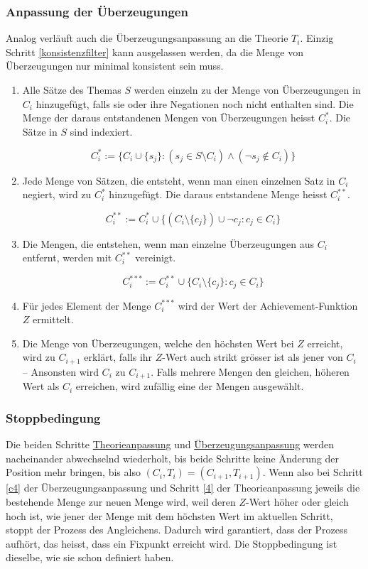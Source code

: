 \documentclass{article}
\begin{document}
\subsubsection{Anpassung der Überzeugungen} \label{C-Anpassung}
Analog verläuft auch die Überzeugungsanpassung an die Theorie $T_i$. Einzig Schritt \ref{konsistenzfilter} kann ausgelassen werden, da die Menge von Überzeugungen nur minimal konsistent sein muss.
\begin{enumerate}
    \item \label{c1} Alle Sätze des Themas $S$ werden einzeln zu der Menge von Überzeugungen in $C_i$ hinzugefügt, falls sie oder ihre Negationen noch nicht enthalten sind. Die Menge der daraus entstandenen Mengen von Überzeugungen heisst $C_i^*$. Die Sätze in $S$ sind indexiert.
    
    $$ 
    C_i^*:= \{ C_i \cup \{s_j\}: (s_j \in S \setminus C_i) \land (\neg s_j \not\in C_i) \}
    $$
    
    \item \label{c1.1} Jede Menge von Sätzen, die entsteht, wenn man einen einzelnen Satz in $C_i$ negiert, wird zu $C_i^*$ hinzugefügt. Die daraus entstandene Menge heisst $C_i^{**}$.
    
    $$
    C_i^{**}:= C_i^* \cup \{ (C_i \setminus \{c_j\}) \cup \neg c_j: c_j \in C_i\}
    $$
    
    \item \label{c2} Die Mengen, die entstehen, wenn man einzelne Überzeugungen aus $C_i$ entfernt, werden mit $C_i^{**}$ vereinigt.
    
    $$
    C_i^{***}:= C_i^{**} \cup \{ C_i \setminus \{c_j\}: c_j \in C_i\}
    $$
    
    \item \label{c3} Für jedes Element der Menge $C_i^{***}$ wird der Wert der Achievement-Funktion $Z$ ermittelt.
    \item \label{c4}Die Menge von Überzeugungen, welche den höchsten Wert bei $Z$ erreicht, wird zu $C_{i+1}$ erklärt, falls ihr $Z$-Wert auch strikt grösser ist als jener von $C_i$ -- Ansonsten wird $C_i$ zu $C_{i+1}$. Falls mehrere Mengen den gleichen, höheren Wert als $C_i$ erreichen, wird zufällig eine der Mengen ausgewählt.\footnotemark[\value{footnote}]
\end{enumerate}

\subsubsection{Stoppbedingung}
Die beiden Schritte \hyperref[T-Anpassung]{Theorieanpassung} und \hyperref[C-Anpassung]{Überzeugungsanpassung} werden nacheinander abwechselnd wiederholt, bis beide Schritte keine Änderung der Position mehr bringen, bis also $(C_i, T_i) = (C_{i+1}, T_{i+1})$. Wenn also bei Schritt \ref{c4} der Überzeugungsanpassung und Schritt \ref{4} der Theorieanpassung jeweils die bestehende Menge zur neuen Menge wird, weil deren $Z$-Wert höher oder gleich hoch ist, wie jener der Menge mit dem höchsten Wert im aktuellen Schritt, stoppt der Prozess des Angleichens. Dadurch wird garantiert, dass der Prozess aufhört, das heisst, dass ein Fixpunkt erreicht wird. Die Stoppbedingung ist dieselbe, wie \cite[S.~450]{beisbart_making_2021} sie schon definiert haben.
\end{document}

